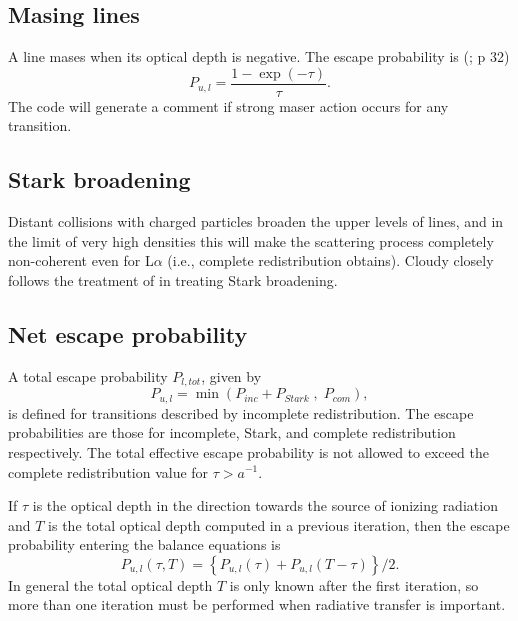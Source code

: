 \subsection{Masing lines }

A line mases when its optical depth is negative.
The escape probability is (\citealp{Elitzur1992}; p 32)
\begin{equation}
{P_{u,l}} = \frac{{1 - \exp \left( { - \tau } \right)}}{\tau }.%
\end{equation}
The code will generate a comment if strong maser action occurs for any
transition.

\subsection{Stark broadening }

Distant collisions with charged particles broaden the upper levels of
lines, and in the limit of very high densities this will make the scattering
process completely non-coherent even for L$\alpha $ (i.e., complete redistribution
obtains).
Cloudy closely follows the treatment of \citet{Puetter1981} in treating
Stark broadening.

\subsection{Net escape probability }

A total escape probability $P_{l, tot}$, given by
\begin{equation}
{P_{u,l}} = \min \left( {{P_{inc}} + {P_{Stark}}\;,\;{P_{com}}} \right),%
\end{equation}
is defined for transitions described by incomplete redistribution.  The
escape probabilities are those for incomplete, Stark, and complete
redistribution respectively.  The total effective escape probability is
not allowed to exceed the complete redistribution value for
$\tau > a^{-1}$.

If $\tau$ is the optical depth in the direction towards the source of ionizing
radiation and $T$ is the total optical depth computed in a previous iteration,
then the escape probability entering the balance equations is
\begin{equation}
{P_{u,l}}\left( {\tau ,T} \right) = \left\{ {{P_{u,l}}\left( \tau  \right)
+ {P_{u,l}}\left( {T - \tau } \right)} \right\}/2.
\end{equation}
In general the total optical depth $T$ is only known after the first iteration,
so more than one iteration must be performed when radiative transfer is
important.

